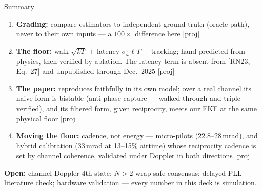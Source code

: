 \documentclass[10pt]{beamer}
\newcommand{\RN}[1]{\textcolor{blue!50!black}{[RN23#1]}}
\newcommand{\proj}[1]{\textcolor{green!35!black}{[proj#1]}}
\begin{document}
\begin{frame}{Summary}
\begin{enumerate}
\item \textbf{Grading:} compare estimators to independent ground truth
(oracle path), never to their own inputs --- a $100\times$ difference
here \proj{}
\item \textbf{The floor:} walk $\sqrt{kT}$ $+$ latency
$\sigma_{\hat\omega}\ell T$ $+$ tracking; hand-predicted from physics,
then verified by ablation. The latency term is absent from
\RN{, Eq.~27} and unpublished through Dec.~2025 \proj{}
\item \textbf{The paper:} reproduces faithfully in its own model; over
a real channel its naive form is bistable (anti-phase capture --- walked
through and triple-verified), and its filtered form, given reciprocity,
meets our EKF at the same physical floor \proj{}
\item \textbf{Moving the floor:} cadence, not energy --- micro-pilots
(22.8--28\,mrad), and hybrid calibration (33\,mrad at 13--15\% airtime)
whose reciprocity cadence is set by channel coherence, validated under
Doppler in both directions \proj{}
\end{enumerate}
\vspace{1ex}
\textbf{Open:} channel-Doppler 4th state; $N{>}2$ wrap-safe consensus;
delayed-PLL literature check; \alert{hardware validation --- every
number in this deck is simulation}.
\end{frame}
\end{document}
